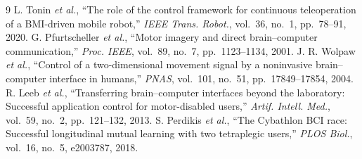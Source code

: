 \documentclass[10pt,twocolumn,a4paper]{article}
\begin{document}
\begin{thebibliography}{9}
\small
{} L. Tonin \textit{et al.}, ``The role of the control
framework for continuous teleoperation of a BMI-driven mobile robot,''
\textit{IEEE Trans. Robot.}, vol.~36, no.~1, pp.~78--91, 2020.
 G. Pfurtscheller \textit{et al.}, ``Motor imagery
and direct brain--computer communication,'' \textit{Proc. IEEE}, vol.~89,
no.~7, pp.~1123--1134, 2001.
 J. R. Wolpaw \textit{et al.}, ``Control of a
two-dimensional movement signal by a noninvasive brain--computer interface in
humans,'' \textit{PNAS}, vol.~101, no.~51, pp.~17849--17854, 2004.
 R. Leeb \textit{et al.}, ``Transferring brain--computer
interfaces beyond the laboratory: Successful application control for
motor-disabled users,'' \textit{Artif. Intell. Med.}, vol.~59, no.~2,
pp.~121--132, 2013.
 S. Perdikis \textit{et al.}, ``The Cybathlon BCI race:
Successful longitudinal mutual learning with two tetraplegic users,''
\textit{PLOS Biol.}, vol.~16, no.~5, e2003787, 2018.
\end{thebibliography}
\end{document}
